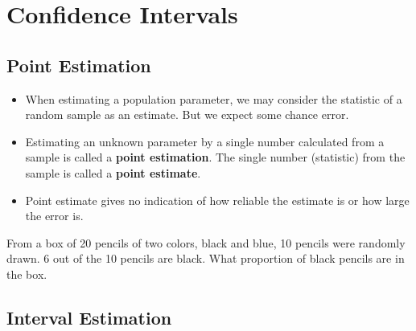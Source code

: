 
\hypertarget{confidence-intervals}{%
\section{Confidence Intervals}\label{confidence-intervals}}

\hypertarget{point-estimation}{%
\subsection{Point Estimation}\label{point-estimation}}

\begin{itemize}
\item
  When estimating a population parameter, we may consider the statistic
  of a random sample as an estimate. But we expect some chance error.
\item
  Estimating an unknown parameter by a single number calculated from a
  sample is called a \textbf{point estimation}. The single number
  (statistic) from the sample is called a \textbf{point estimate}.
\item
  Point estimate gives no indication of how reliable the estimate is or
  how large the error is.
\end{itemize}

\begin{example}

From a box of 20 pencils of two colors, black and blue, 10 pencils were
randomly drawn. 6 out of the 10 pencils are black. What proportion of
black pencils are in the box.

\end{example}
\vspace*{6\baselineskip}


\hypertarget{interval-estimation}{%
\subsection{Interval Estimation}\label{interval-estimation}}

